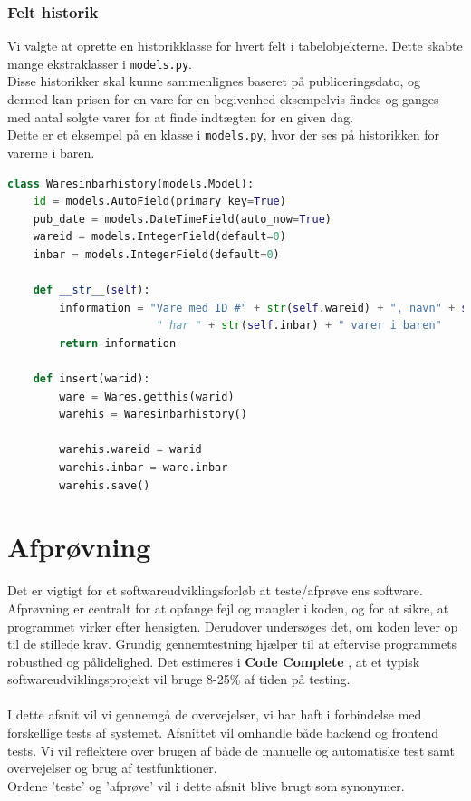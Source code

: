 \documentclass[]{article}
\begin{document}
\subsubsection{Felt historik}
\noindent Vi valgte at oprette en historikklasse for hvert felt i tabelobjekterne. Dette skabte mange ekstraklasser i \texttt{models.py}. \\
Disse historikker skal kunne sammenlignes baseret på publiceringsdato, og dermed kan prisen for en vare for en begivenhed eksempelvis findes og ganges med antal solgte varer for at finde indtægten for en given dag. \\
Dette er et eksempel på en klasse i \texttt{models.py}, hvor der ses på historikken for varerne i baren.
\begin{lstlisting}[language=Python]
class Waresinbarhistory(models.Model):
    id = models.AutoField(primary_key=True)
    pub_date = models.DateTimeField(auto_now=True)
    wareid = models.IntegerField(default=0)
    inbar = models.IntegerField(default=0)
    
    def __str__(self):
        information = "Vare med ID #" + str(self.wareid) + ", navn" + self.warename + 
                       " har " + str(self.inbar) + " varer i baren"
        return information
    
    def insert(warid):
        ware = Wares.getthis(warid)
        warehis = Waresinbarhistory()
        
        warehis.wareid = warid
        warehis.inbar = ware.inbar
        warehis.save()        

\end{lstlisting}

\pagebreak[3]

\section{Afprøvning} \label{Afprovning}
Det er vigtigt for et softwareudviklingsforløb at teste/afprøve ens software. Afprøvning er centralt for at opfange fejl og mangler i koden, og for at sikre, at programmet virker efter hensigten. Derudover undersøges det, om koden lever op til de stillede krav. Grundig gennemtestning hjælper til at eftervise programmets robusthed og pålidelighed. Det estimeres i \textbf{Code Complete} \cite{mcconnell2004code}, at et typisk softwareudviklingsprojekt vil bruge 8-25\% af tiden på testing.  \\ \\
I dette afsnit vil vi gennemgå de overvejelser, vi har haft i forbindelse med forskellige tests af systemet. Afsnittet vil omhandle både backend og frontend tests. Vi vil reflektere over brugen af både de manuelle og automatiske test samt overvejelser og brug af testfunktioner. \\
Ordene 'teste' og 'afprøve' vil i dette afsnit blive brugt som synonymer. 
\end{document}
